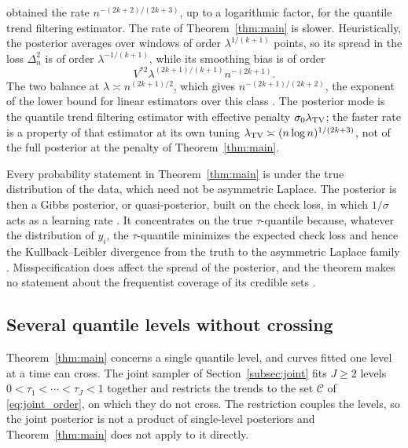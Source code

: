 \begin{remark}
\citet{madrid2022risk} obtained the rate $n^{-(2k+2)/(2k+3)}$, up to a logarithmic factor, for the quantile trend filtering estimator. The rate of Theorem~\ref{thm:main} is slower. Heuristically, the posterior averages over windows of order $\lambda^{1/(k+1)}$ points, so its spread in the loss $\Delta_n^2$ is of order $\lambda^{-1/(k+1)}$, while its smoothing bias is of order
\[
V^{*2}\lambda^{(2k+1)/(k+1)}n^{-(2k+1)}.
\]
The two balance at $\lambda\asymp n^{(2k+1)/2}$, which gives $n^{-(2k+1)/(2k+2)}$, the exponent of the lower bound for linear estimators over this class \citetext{\citealp{donoho1998minimax}; \citealp[Section~5.1]{tibshirani2014adaptive}}. The posterior mode is the quantile trend filtering estimator with effective penalty $\sigma_0\lambda_{\mathrm{TV}}$; the faster rate is a property of that estimator at its own tuning $\lambda_{\mathrm{TV}}\asymp(n\log n)^{1/(2k+3)}$, not of the full posterior at the penalty of Theorem~\ref{thm:main}.
\end{remark}

\begin{remark}[Misspecification]
Every probability statement in Theorem~\ref{thm:main} is under the true distribution of the data, which need not be asymmetric Laplace. The posterior is then a Gibbs posterior, or quasi-posterior, built on the check loss, in which $1/\sigma$ acts as a learning rate \citep{syring2023gibbs,atchade2017contraction}. It concentrates on the true $\tau$-quantile because, whatever the distribution of $y_i$, the $\tau$-quantile minimizes the expected check loss and hence the Kullback--Leibler divergence from the truth to the asymmetric Laplace family \citep{sriram2013posterior}. Misspecification does affect the spread of the posterior, and the theorem makes no statement about the frequentist coverage of its credible sets \citep{yang2016posterior}.
\end{remark}

\subsection{Several quantile levels without crossing}\label{sec:joint-result}

Theorem~\ref{thm:main} concerns a single quantile level, and curves fitted one level at a time can cross. The joint sampler of Section~\ref{subsec:joint} fits $J\ge2$ levels $0<\tau_1<\cdots<\tau_J<1$ together and restricts the trends to the set $\mathcal C$ of \eqref{eq:joint_order}, on which they do not cross. The restriction couples the levels, so the joint posterior is not a product of single-level posteriors and Theorem~\ref{thm:main} does not apply to it directly.

